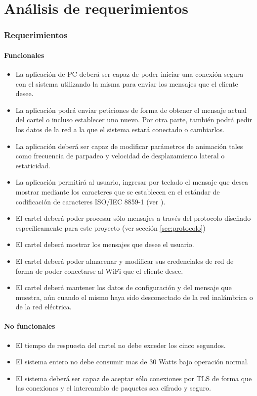 \clearpage
\part{Análisis de requerimientos}\label{part:analisis}
\section{Requerimientos}
\subsection{Funcionales}
\begin{itemize}
	\item La aplicación de PC deberá ser capaz de poder iniciar una conexión segura con el sistema utilizando la misma para enviar los mensajes que el cliente desee.
	\item La aplicación podrá enviar peticiones de forma de obtener el mensaje actual del cartel o incluso establecer uno nuevo. Por otra parte, también podrá pedir los datos de la red a la que el sistema estará conectado o cambiarlos.
	\item La aplicación deberá ser capaz de modificar parámetros de animación tales como frecuencia de parpadeo y velocidad de desplazamiento lateral o estaticidad.
	\item La aplicación permitirá al usuario, ingresar por teclado el mensaje que desea mostrar mediante los caracteres que se establecen en el estándar de codificación de caracteres ISO/IEC 8859-1 (ver \cite{CodifChar}).
	\item El cartel deberá poder procesar sólo mensajes a través del protocolo diseñado específicamente para este proyecto (ver sección \ref{sec:protocolo})
	\item El cartel deberá mostrar los mensajes que desee el usuario.
	\item El cartel deberá poder almacenar y modificar sus credenciales de red de forma de poder conectarse al WiFi que el cliente desee.
	\item El cartel deberá mantener los datos de configuración y del mensaje que muestra, aún cuando el mismo haya sido desconectado de la red inalámbrica o de la red eléctrica.
\end{itemize}

\subsection{No funcionales}
\begin{itemize}
	\item El tiempo de respuesta del cartel no debe exceder los cinco segundos.
	\item El sistema entero no debe consumir mas de 30 Watts bajo operación normal.
	\item El sistema deberá ser capaz de aceptar sólo conexiones por TLS \cite{TLS} de forma que las conexiones y el intercambio de paquetes sea cifrado y seguro.
\end{itemize}
